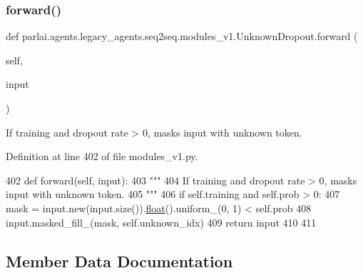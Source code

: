 \subsubsection{\texorpdfstring{forward()}{forward()}}
{\footnotesize\ttfamily def parlai.\+agents.\+legacy\+\_\+agents.\+seq2seq.\+modules\+\_\+v1.\+Unknown\+Dropout.\+forward (\begin{DoxyParamCaption}\item[{}]{self,  }\item[{}]{input }\end{DoxyParamCaption})}

\begin{DoxyVerb}If training and dropout rate > 0, masks input with unknown token.
\end{DoxyVerb}
 

Definition at line 402 of file modules\+\_\+v1.\+py.


\begin{DoxyCode}
402     \textcolor{keyword}{def }forward(self, input):
403         \textcolor{stringliteral}{"""}
404 \textcolor{stringliteral}{        If training and dropout rate > 0, masks input with unknown token.}
405 \textcolor{stringliteral}{        """}
406         \textcolor{keywordflow}{if} self.training \textcolor{keywordflow}{and} self.prob > 0:
407             mask = input.new(input.size()).\hyperlink{namespaceprojects_1_1controllable__dialogue_1_1make__control__dataset_aa2b7207688c641dbc094ab44eca27113}{float}().uniform\_(0, 1) < self.prob
408             input.masked\_fill\_(mask, self.unknown\_idx)
409         \textcolor{keywordflow}{return} input
410 
411 
\end{DoxyCode}


\subsection{Member Data Documentation}
\mbox{\label{classparlai_1_1agents_1_1legacy__agents_1_1seq2seq_1_1modules__v1_1_1UnknownDropout_a7d5b061b69c0857aec6dfe3f3f5cd9ed}} 
